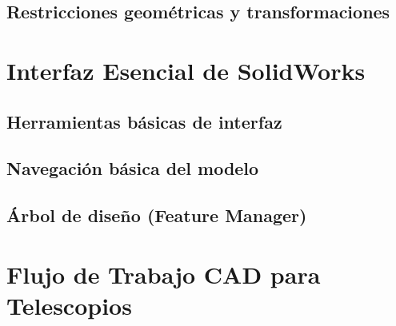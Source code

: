 \subsection{Restricciones geométricas y transformaciones}

\section{Interfaz Esencial de SolidWorks}

\subsection{Herramientas básicas de interfaz}

\subsection{Navegación básica del modelo}

\subsection{Árbol de diseño (Feature Manager)}

\section{Flujo de Trabajo CAD para Telescopios}

